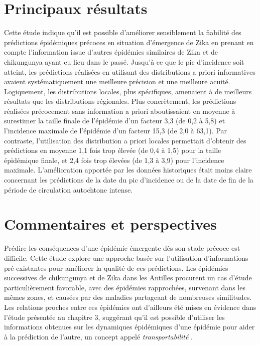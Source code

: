 \section{Principaux résultats}

Cette étude indique qu'il est possible d'améliorer sensiblement la fiabilité des prédictions épidémiques précoces en situation d'émergence de Zika en prenant en compte l'information issue d'autres épidémies similaires de Zika et de chikungunya ayant eu lieu dans le passé.
Jusqu'à ce que le pic d'incidence soit atteint, les prédictions réalisées en utilisant des distributions a priori informatives avaient systématiquement une meilleure précision et une meilleure acuité.
Logiquement, les distributions locales, plus spécifiques, amenaient à de meilleurs résultats que les distributions régionales.
Plus concrètement, les prédictions réalisées précocement sans information a priori aboutissaient en moyenne à surestimer la taille finale de l'épidémie d'un facteur 3,3 (de 0,2 à 5,8) et l'incidence maximale de l'épidémie d'un facteur 15,3 (de 2,0 à 63,1).
Par contraste, l'utilisation des distribution a priori locales permettait d'obtenir des prédictions en moyenne 1,1 fois trop élevée (de 0,4 à 1,5) pour la taille épidémique finale, et 2,4 fois trop élevées (de 1,3 à 3,9) pour l'incidence maximale. 
L'amélioration apportée par les données historiques était moins claire concernant les prédictions de la date du pic d'incidence ou de la date de fin de la période de circulation autochtone intense.

\section{Commentaires et perspectives}

Prédire les conséquences d'une épidémie émergente dès son stade précoce est difficile.
Cette étude explore une approche basée sur l'utilisation d'informations pré-existantes pour améliorer la qualité de ces prédictions.
Les épidémies successives de chikungunya et de Zika dans les Antilles procurent un cas d'étude particulièrement favorable, avec des épidémies rapprochées, survenant dans les mêmes zones, et causées par des maladies partageant de nombreuses similitudes.
Les relations proches entre ces épidémies ont d'ailleurs été mises en évidence dans l'étude présentée au chapitre 3, suggérant qu'il est possible d'utiliser les informations obtenues sur les dynamiques épidémiques d'une épidémie pour aider à la prédiction de l'autre, un concept appelé {\em transportabilité} \cite{pearl2014external}.

